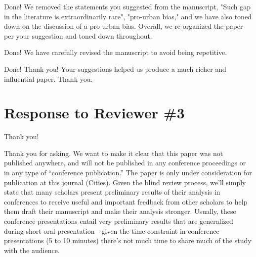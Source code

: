 Done! We removed the statements you suggested from the manuscript, "Such gap in the literature is extraordinarily rare", "pro-urban bias," and we have also toned down on the discussion of a pro-urban bias. Overall, we re-organized the paper per your suggestion and toned down throughout.\\


Done! We have carefully revised the manuscript to avoid being repetitive. 


Done! Thank you! Your suggestions helped us produce a much richer and influential paper. Thank you.

\newpage
\section{Response to Reviewer \#3} 


Thank you!


  
Thank you for asking. We want to make it clear that this paper was not published
anywhere, and will not be published in any conference proceedings or in any type
of ``conference publication.'' The paper is only under consideration for
publication at this journal (Cities). Given the blind review process, we'll
simply state that many scholars present preliminary results of their analysis in
conferences to receive useful and important feedback from other scholars to help
them draft their manuscript and make their analysis stronger. Usually, these
conference presentations entail very preliminary results that are generalized
during short oral presentation---given the time constraint in conference
presentations (5 to 10 minutes) there's not much time to share much of the study
 with the audience. \\
  
